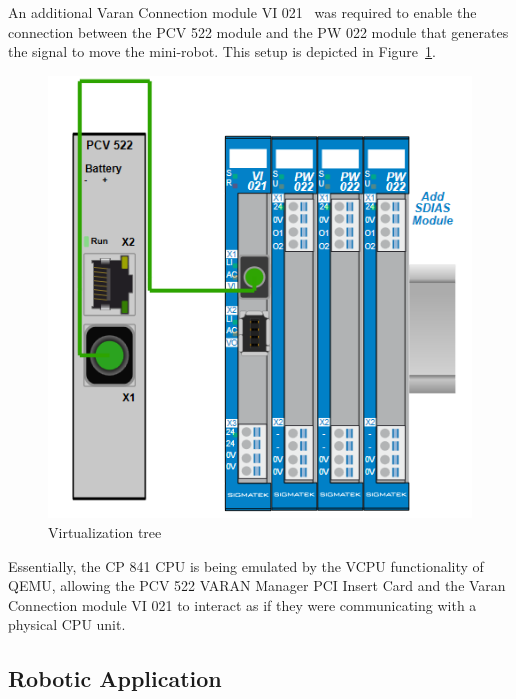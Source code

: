 \documentclass[MMR,Master,english]{twbook}
\begin{document}
\noindent An additional Varan Connection module VI 021~\cite{InterfacesSplittersSIGMATEK} was required to enable the connection between the PCV 522 module and the PW 022 module that generates the signal to move the mini-robot. This setup is depicted in Figure~\ref{fig:virt_tree}.

\begin{figure}[H]
	\centering
	\includegraphics[width=0.5\columnwidth]{img/experiment/virt_tree.png}
	\caption[Virtualization tree]{Virtualization tree}
	\label{fig:virt_tree}
\end{figure}

\noindent Essentially, the CP 841 CPU is being emulated by the VCPU functionality of QEMU, allowing the PCV 522 VARAN Manager PCI Insert Card and the Varan Connection module VI 021 to interact as if they were communicating with a physical CPU unit.

\clearpage
\subsection{Robotic Application}

\clearpage
\end{document}
